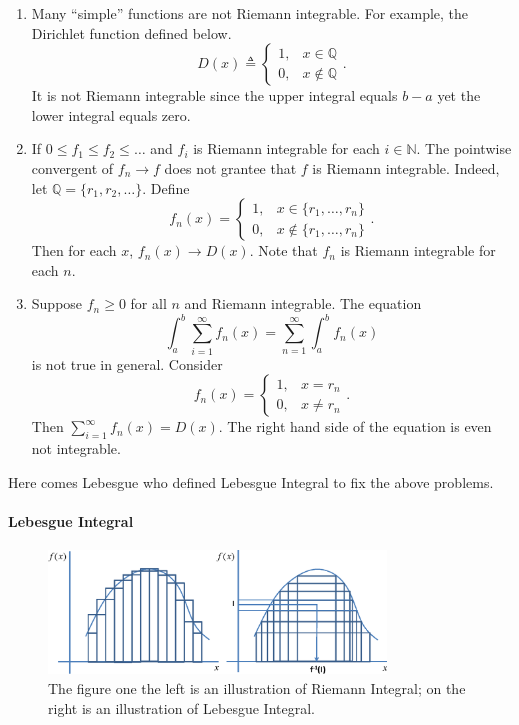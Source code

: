 \documentclass[12pt,a4paper]{report}
\numberwithin{equation}{section}
\theoremstyle{mystyle}
\newcommand{\N}{\mathbb{N}}
\begin{document}
	\begin{enumerate}
		\item Many ``simple'' functions are not Riemann integrable. For example, the Dirichlet function defined below.
		$$
		D(x)\triangleq \begin{cases}
			1, &x\in \mathbb{Q}\\
			0, &x\notin \mathbb{Q}
		\end{cases}.
		$$
		It is not Riemann integrable since the upper integral equals $b-a$ yet the lower integral equals zero.
		\item If $0\leq f_1\leq f_2\leq \dots$ and $f_i$ is Riemann integrable for each $i\in \N$. The pointwise convergent of $f_n\to f$ does not grantee that $f$ is Riemann integrable. Indeed, let $\mathbb{Q}=\{r_1,r_2,\dots\}$. Define
		$$
		f_n(x)=
		\begin{cases}
			1, & x\in \{r_1,\dots,r_n\}\\
			0, & x\notin \{r_1,\dots,r_n\}
		\end{cases}.
		$$
		Then for each $x$, $f_n(x)\to D(x)$. Note that $f_n$ is Riemann integrable for each $n$.
		\item Suppose $f_n\geq 0$ for all $n$ and Riemann integrable. The equation
		\begin{equation}
			\int_a^b \sum_{i=1}^\infty f_n(x)= \sum_{n=1}^\infty \int_a^b f_n(x)
		\end{equation}
		is not true in general. Consider
		$$
		f_n(x)=
		\begin{cases}
			1, & x=r_n\\
			0, & x\neq r_n
		\end{cases}.
		$$
		Then $\sum_{i=1}^\infty f_n(x)=D(x)$. The right hand side of the equation is even not integrable.
	\end{enumerate}
	Here comes Lebesgue who defined Lebesgue Integral to fix the above problems.
	
	\paragraph{Lebesgue Integral}
		\begin{figure}
		\centering
		\includegraphics[width=0.80\textwidth]{figures/Riem-Leb.jpg}
		\caption{The figure one the left is an illustration of Riemann Integral; on the right is an illustration of Lebesgue Integral.}
	\end{figure}
	
\end{document}
